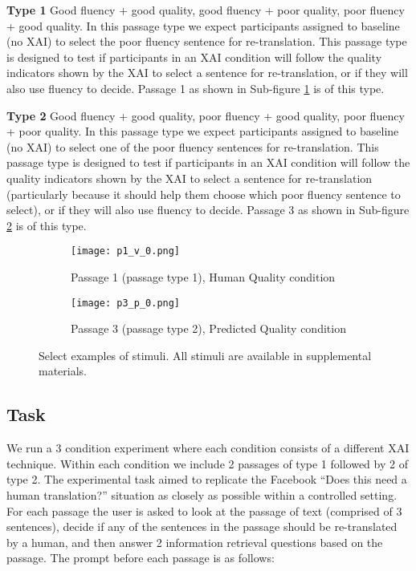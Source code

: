 \begin{compacthang}
    \item \textbf{Type 1} Good fluency + good quality, good fluency + poor quality, poor fluency + good quality. In this passage type we expect participants assigned to baseline (no XAI) to select the poor fluency sentence for re-translation. This passage type is designed to test if participants in an XAI condition will follow the quality indicators shown by the XAI to select a sentence for re-translation, or if they will also use fluency to decide. Passage 1 as shown in Sub-figure \ref{fig:p1_human_quality} is of this type.    

    \item \textbf{Type 2} Good fluency + good quality, poor fluency + good quality, poor fluency + poor quality. In this passage type we expect participants assigned to baseline (no XAI) to select one of the poor fluency sentences for re-translation. This passage type is designed to test if participants in an XAI condition will follow the quality indicators shown by the XAI to select a sentence for re-translation (particularly because it should help them choose which poor fluency sentence to select), or if they will also use fluency to decide. Passage 3 as shown in Sub-figure \ref{fig:p3_predicted_quality} is of this type.     
\end{compacthang}

\begin{figure}
    \centering
    
    \begin{subfigure}[t]{0.45\textwidth}
        \centering
        \texttt{[image: p1\_v\_0.png]} 
        \caption{Passage 1 (passage type 1), Human Quality condition} \label{fig:p1_human_quality}
    \end{subfigure}
    \hfill
     \begin{subfigure}[t]{0.45\textwidth}
        \centering
        \texttt{[image: p3\_p\_0.png]} 
        \caption{Passage 3 (passage type 2), Predicted Quality condition} \label{fig:p3_predicted_quality}
    \end{subfigure}
    
    \caption{Select examples of stimuli. All stimuli are available in supplemental materials.}
    \label{fig:exp_stim}
    
\end{figure}

\subsection{Task} 
We run a 3 condition experiment where each condition consists of a different XAI technique. Within each condition we include 2 passages of type 1 followed by 2 of type 2. The experimental task aimed to replicate the Facebook “Does this need a human translation?” situation as closely as possible within a controlled setting. For each passage the user is asked to look at the passage of text (comprised of 3 sentences), decide if any of the sentences in the passage should be re-translated by a human, and then answer 2 information retrieval questions based on the passage. The prompt before each passage is as follows:

